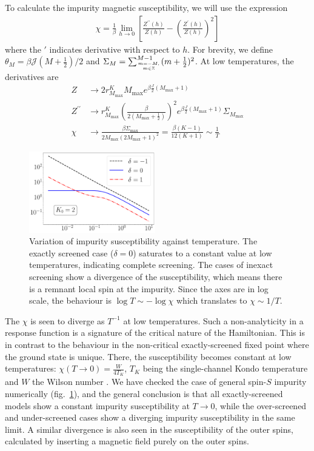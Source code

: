 \documentclass[reprint,prb,superscriptaddress]{revtex4-2}
\begin{document}
To calculate the impurity magnetic susceptibility, we will use the expression
\begin{align}
	\chi = \frac{1}{\beta}\lim_{h \to 0}\left[\frac{Z^{\prime\prime}(h)}{Z(h)} - \left(\frac{Z^{\prime}(h)}{Z(h)}\right)^2 \right] 
\end{align}
where the \(\prime\) indicates derivative with respect to \(h\). For brevity, we define \(\theta_M = \beta {\mathcal{J}} (M+\frac{1}{2})/2\) and \(\Sigma_M = \sum_{m=-M, \atop{m\in \mathbb{Z}}}^{M-1}(m+\frac{1}{2})^2\). At low temperatures, the derivatives are 
\begin{align}
	Z &\to 2 r^K_{M_\text{max}} M_\text{max} e^{\beta \frac{J}{2}(M_\text{max} + 1)}\\
	Z^{\prime \prime} &\to r^K_{M_\text{max}}\left(\frac{\beta }{2(M_\text{max} + \frac{1}{2})}\right)^2 e^{\beta \frac{J}{2}(M_\text{max} + 1)}\Sigma_{M_\text{max}}\\
	\chi &\to \frac{\beta\Sigma_\text{max}}{2M_\text{max}\left(2M_\text{max}+1\right)^2} = \frac{\beta(K-1)}{12(K+1)} \sim \frac{1}{T}
\end{align}

\begin{figure}[!htpb]
\centering
\includegraphics[width=0.49\textwidth]{plt/CentralFieldChiPowerlaw.pdf}
\caption{Variation of impurity susceptibility against temperature. The exactly screened case ($\delta=0$) saturates to a constant value at low temperatures, indicating complete screening. The cases of inexact screening show a divergence of the susceptibility, which means there is a remnant local spin at the impurity. Since the axes are in log scale, the behaviour is $\log T \sim -\log \chi$ which translates to $\chi \sim 1/T$.  }
\label{fig:suseptibility_impurity}
\end{figure}

The \(\chi\) is seen to diverge as \(T^{-1}\) at low temperatures. Such a non-analyticity in a response function is a signature of the critical nature of the Hamiltonian. This is in contrast to the behaviour in the non-critical exactly-screened fixed point where the ground state is unique. There, the susceptibility becomes constant at low temperatures: \(\chi(T\to 0) = \frac{W}{4 T_K}\), \(T_K\) being the single-channel Kondo temperature and \(W\) the Wilson number \cite{wilson1975renormalization,nozieres1974fermi,bullaNRGreview,kondo_urg}. We have checked the case of general spin-\(S\) impurity numerically (fig.~\ref{fig:suseptibility_impurity}), and the general conclusion is that all exactly-screened models show a constant impurity susceptibility at \(T \to 0\), while the over-screened and under-screened cases show a diverging impurity susceptibility in the same limit. A similar divergence is also seen in the susceptibility of the outer spins, calculated by inserting a magnetic field purely on the outer spins.
\end{document}
